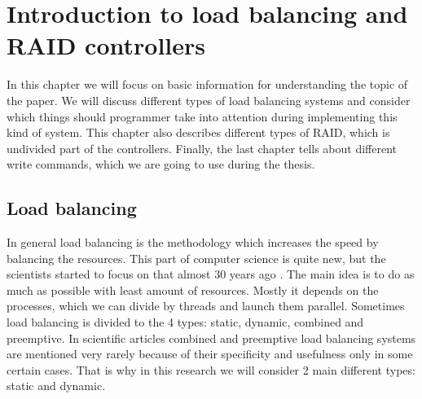 \chapter{Introduction to load balancing and RAID controllers}
\label{chap2:title}

In this chapter we will focus on basic information for understanding the topic of the paper. We will discuss different types of load balancing systems and consider which things should programmer take into attention during implementing this kind of system. This chapter also describes different types of RAID, which is undivided part of the controllers. Finally, the last chapter tells about different write commands, which we are going to use during the thesis.

\newpage
\section{Load balancing}
In general load balancing is the methodology which increases the speed by balancing the resources. This part of computer science is quite new, but the scientists started to focus on that almost 30 years ago \cite{stat_load_bal_1985}. The main idea is to do as much as possible with least amount of resources. Mostly it depends on the processes, which we can divide by threads and launch them parallel. Sometimes load balancing is divided to the 4 types: static, dynamic, combined and preemptive. In scientific articles combined and preemptive load balancing systems are mentioned very rarely because of their specificity and usefulness only in some certain cases. That is why in this research we will consider 2 main different types: static and dynamic.

